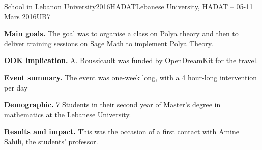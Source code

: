 \begin{event}{School in Lebanon University}{2016HADAT}{Lebanese University, HADAT -- 05-11 Mars 2016}{UB}{7}{}

\textbf{Main goals.} The goal was to organise a class on Polya theory and then
to deliver training sessions on Sage Math to implement Polya Theory.

\textbf{ODK implication.} A. Boussicault was funded by OpenDreamKit for the travel.

\textbf{Event summary.}
The event was one-week long, with a 4 hour-long intervention per day

\textbf{Demographic.} 7 Students in their second year of Master's degree in mathematics at the Lebanese University.


\textbf{Results and impact.}
This was the occasion of a first contact with Amine Sahili, the students' professor.


\end{event}

